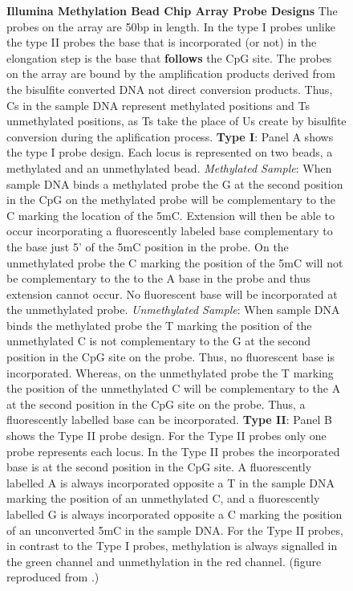 \documentclass[]{book}
\begin{document}
\begin{figure}
\caption{\textbf{Illumina Methylation Bead Chip Array Probe Designs}
The probes on the array are 50bp in length. In the type I probes unlike the type II probes the base that is incorporated (or not) in the elongation step is the base that \textbf{follows} the CpG site. The probes on the array are bound by the amplification products derived from the bisulfite converted DNA not direct conversion products. Thus, Cs in the sample DNA represent methylated positions and Ts unmethylated positions, as Ts take the place of Us create by bisulfite conversion during the aplification process.
\textbf{Type I}: Panel A shows the type I probe design. Each locus is represented on two beads, a methylated and an unmethylated bead.
\emph{Methylated Sample}: When sample DNA binds a methylated probe the G at the second position in the CpG on the methylated probe will be complementary to the C marking the location of the 5mC. Extension will then be able to occur incorporating a fluorescently labeled base complementary to the base just 5' of the 5mC position in the probe. On the unmethylated probe the C marking the position of the 5mC will not be complementary to the to the A base in the probe and thus extension cannot occur. No fluorescent base will be incorporated at the unmethylated probe.
\emph{Unmethylated Sample}: When sample DNA binds the methylated probe the T marking the position of the unmethylated C is not complementary to the G at the second position in the CpG site on the probe. Thus, no fluorescent base is incorporated. Whereas, on the unmethylated probe the T marking the position of the unmethylated C will be complementary to the A at the second position in the CpG site on the probe. Thus, a fluorescently labelled base can be incorporated.
\textbf{Type II}: Panel B shows the Type II probe design. For the Type II probes only one probe represents each locus. In the Type II probes the incorporated base is at the second position in the CpG site. A fluorescently labelled A is always incorporated opposite a T in the sample DNA marking the position of an unmethylated C, and a fluorescently labelled G is always incorporated opposite a C marking the position of an unconverted 5mC in the sample DNA. For the Type II probes, in contrast to the Type I probes, methylation is always signalled in the green channel and unmethylation in the red channel.
(figure reproduced from \citep{Bibikova2011}.)}\label{fig:Bibikova2011IlluminaMethylationBeadChip}
\end{figure}
\end{document}
